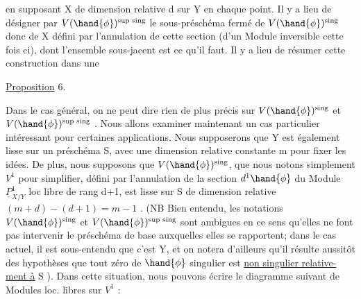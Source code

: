 
en supposant X de dimension relative d sur Y en chaque point.  Il y a
lieu de  désigner par  $V(\hand{\phi})^{\text{sup sing}}$ le sous-préschéma fermé de
 $V(\hand{\phi})^{\text{sing}}$ donc de X défini par l'annulation de cette section (d'un Module
inversible cette fois ci),  dont l'ensemble  sous-jacent est ce qu'il
faut. Il y a lieu de\placedmargin{\unsure{$/\,/$}} résumer cette construction dans une

\uline{Proposition} 6.

Dans le cas général, on ne peut  dire rien de plus précis sur
$V(\hand{\phi})^{\text{sing}}$ et $V(\hand{\phi})^{\text{sup sing}}$ .  Nous allons  examiner maintenant un cas
particulier\hand{,} intéressant pour certaines applications. Nous supposerons
que Y est également lisse sur un préschéma S, avec une dimension relative
constante m pour fixer les idées.  De plus, nous supposons que $V(\hand{\phi})^{\text{sing}}$,
que nous notons simplement $V^1$ pour simplifier, défini  par l'annulation
de la section $d^1\hand{\phi}$  du Module $\underline{P}^1_{X/Y}$  loc libre de  rang d+1,
est  lisse sur S de dimension relative  $(m+d) - (d+1) = m-1$ . (NB  Bien
entendu, les notations $V(\hand{\phi})^{\text{sing}}$ et $V(\hand{\phi})^{\text{sup sing}}$ sont ambigues en ce sens
qu'elles ne font pas intervenir le préschéma de base  auxquelles elles
se rapportent; dans le cas actuel,  il est sous-entendu que c'est Y,
et on notera d'ailleurs qu'il résulte aussitôt des hypothèses que tout zéro de $\hand{\phi}$ singulier est \uline{non singulier relative-}%
\uline{ment à} S ).  Dans cette situation, nous pouvons écrire  le diagramme
suivant de Modules loc. libres sur $V^1$ :

